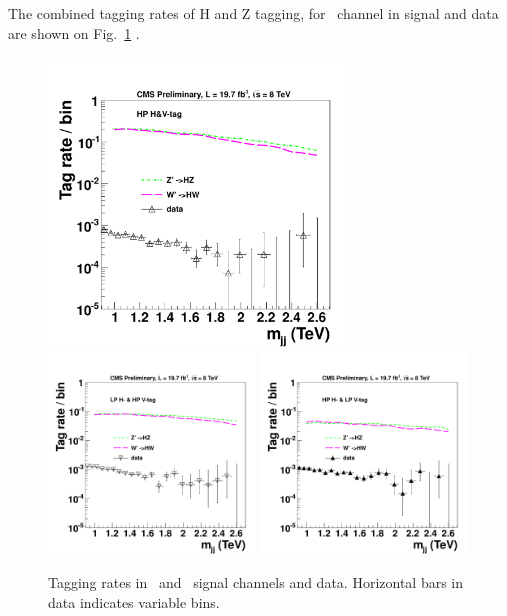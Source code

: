 The combined tagging rates of H and Z tagging, 
for \HwwZqq\ channel in signal and data are shown on Fig.~\ref{fig:HwwEffAll} .

\begin{figure}[ht!b]
\begin{center}
\includegraphics[width=0.70\textwidth]{EXO-14-009/HqqqqZqqfigs/Signal/HwwVqq-signal-taggingEff-8TeV.pdf}
\includegraphics[width=0.49\textwidth]{EXO-14-009/HqqqqZqqfigs/Signal/HwwVqq-signal-taggingEff-LowH-8TeV.pdf}
\includegraphics[width=0.49\textwidth]{EXO-14-009/HqqqqZqqfigs/Signal/HwwVqq-signal-taggingEff-LowV-8TeV.pdf}
\end{center}
\caption{
Tagging rates in \HwwZqq\ and \HwwWqq\ signal channels and data.
Horizontal bars
in data indicates variable bins.}
\label{fig:HwwEffAll}
\end{figure}

